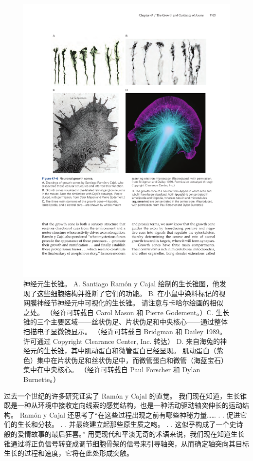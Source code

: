\begin{figure}[htbp]
	\centering
	\includegraphics[width=0.8\linewidth]{chap47/fig_47_6}
	\caption{神经元生长锥。 A. Santiago Ramón y Cajal 绘制的生长锥图，他发现了这些细胞结构并推断了它们的功能。 B. 在小鼠中染料标记的视网膜神经节神经元中可视化的生长锥。 请注意与卡哈尔绘画的相似之处。 （经许可转载自 Carol Mason 和 Pierre Godement。）C. 生长锥的三个主要区域——丝状伪足、片状伪足和中央核心——通过整体扫描电子显微镜显示。 （经许可转载自 Bridgman 和 Dailey 1989。许可通过 Copyright Clearance Center, Inc. 转达） D. 来自海兔的神经元的生长锥，其中肌动蛋白和微管蛋白已经显现。 肌动蛋白（紫色）集中在片状伪足和丝状伪足中，而微管蛋白和微管（海蓝宝石）集中在中央核心。 （经许可转载自 Paul Forscher 和 Dylan Burnette。）}
	\label{fig:47_6}
\end{figure}

过去一个世纪的许多研究证实了 Ramón y Cajal 的直觉。 我们现在知道，生长锥既是一种从环境中接收定向线索的感觉结构，也是一种活动驱动轴突伸长的运动结构。 Ramón y Cajal 还思考了“在这些过程出现之前有哪些神秘力量…… . . 促进它们的生长和分枝。 . . 并最终建立起那些原生质之吻。 . . 这似乎构成了一个史诗般的爱情故事的最后狂喜。” 用更现代和平淡无奇的术语来说，我们现在知道生长锥通过将正负信号转变成调节细胞骨架的信号来引导轴突，从而确定轴突向其目标生长的过程和速度，它将在此处形成突触。

